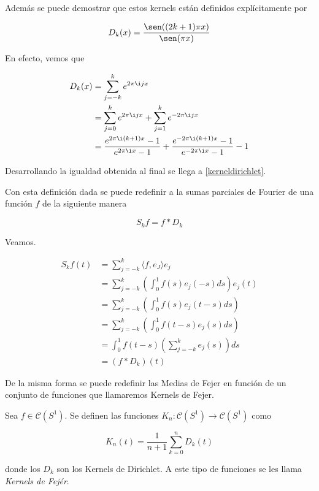 Además se puede demostrar que estos kernels están definidos explícitamente por

\begin{equation}\label{kerneldirichlet}
D_k(x) = \frac{\sen ((2k+1)\pi x)}{\sen (\pi x)}
\end{equation}

En efecto, vemos que

\begin{align}
	D_k(x) &= \sum_{j=-k}^{k} e^{2\pi \i jx}\\
	&= \sum_{j=0}^{k} e^{2\pi \i jx} + \sum_{j=1}^{k} e^{-2\pi \i jx}\\
	&= \frac{e^{2\pi \i (k+1)x}-1}{e^{2\pi \i x} - 1} + \frac{e^{-2\pi \i (k+1)x}-1}{e^{-2\pi \i x} - 1} - 1
\end{align}

Desarrollando la igualdad obtenida al final se llega a \eqref{kerneldirichlet}.



Con esta definición dada se puede redefinir a la sumas parciales de Fourier de una función $f$ de la siguiente manera

\begin{equation}
	S_k f = f * D_k
\end{equation}

Veamos.

\begin{align}
	S_k f (t) &= \sum_{j=-k}^{k} \langle f,e_J \rangle e_j\\
	&= \sum_{j=-k}^{k} \left( \int_{0}^{1} f(s)e_j(-s)ds \right) e_j(t)\\
	&= \sum_{j=-k}^{k} \left( \int_{0}^{1} f(s) e_j(t-s)ds \right)\\
	&= \sum_{j=-k}^{k} \left( \int_{0}^{1} f(t-s) e_j(s) ds \right)\\
	&= \int_{0}^{1} f(t-s) \left( \sum_{j=-k}^{k} e_j (s) \right) ds\\
	&= (f * D_k)(t)
\end{align}

De la misma forma se puede redefinir las Medias de Fejer en función de un conjunto de funciones que llamaremos  Kernels de Fejer.

\begin{definicion}
	Sea $f \in \mathcal{C}(S^1)$. Se definen las funciones $K_n: \mathcal{C}(S^1) \rightarrow \mathcal{C}(S^1)$ como
	
	\begin{equation}
		K_n(t) = \frac{1}{n+1} \sum_{k=0}^{n} D_k(t)
	\end{equation} 
	
	donde los $D_k$ son los Kernels de Dirichlet. A este tipo de funciones se les llama \textit{Kernels de Fejér}.
\end{definicion}

